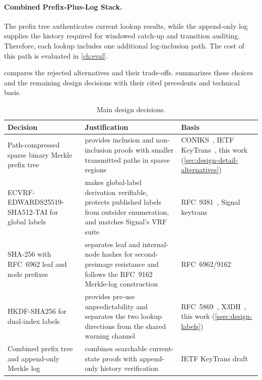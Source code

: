 \paragraph{Combined Prefix-Plus-Log Stack.} The prefix tree authenticates current lookup results,
while the append-only log supplies the history required for windowed catch-up and transition
auditing. Therefore, each lookup includes one additional log-inclusion path. The cost of this path
is evaluated in \cref{ch:eval}.

 compares the rejected alternatives and their trade-offs.
 summarizes these choices and the remaining design decisions with their
cited precedents and technical basis.

\FloatBarrier
\begin{table}[htbp]
\centering
\caption{Main design decisions.}
\label{tab:design-decisions}
\setlength{\extrarowheight}{2pt}
\small
\begin{tabularx}{\textwidth}{@{}>{\raggedright\arraybackslash}p{3.7cm}>{\raggedright\arraybackslash}X>{\raggedright\arraybackslash}p{3.3cm}@{}}
\toprule
Decision & Justification & Basis \\
\midrule
Path-compressed sparse binary Merkle prefix tree & provides inclusion and non-inclusion proofs with smaller transmitted paths in sparse regions & CONIKS~\cite{melara2015coniks}, IETF KeyTrans~\cite{ietf-keytrans-protocol}, this work (\cref{sec:design-detail-alternatives}) \\
ECVRF-EDWARDS25519-SHA512-TAI for global labels & makes global-label derivation verifiable, protects published labels from outsider enumeration, and matches Signal's VRF suite & RFC~9381~\cite{rfc9381}, Signal keytrans~\cite{signal-kt-server} \\
SHA-256 with RFC~6962 leaf and node prefixes & separates leaf and internal-node hashes for second-preimage resistance and follows the RFC~9162 Merkle-log construction & RFC~6962/9162~\cite{rfc6962,rfc9162} \\
HKDF-SHA256 for dual-index labels & provides pre-use unpredictability and separates the two lookup directions from the shared warning channel & RFC~5869~\cite{rfc5869}, X3DH~\cite{x3dh}, this work (\cref{ssec:design-labels}) \\
Combined prefix tree and append-only Merkle log & combines searchable current-state proofs with append-only history verification & IETF KeyTrans draft~\cite{ietf-keytrans-protocol} \\

\end{tabularx}
\end{table}

